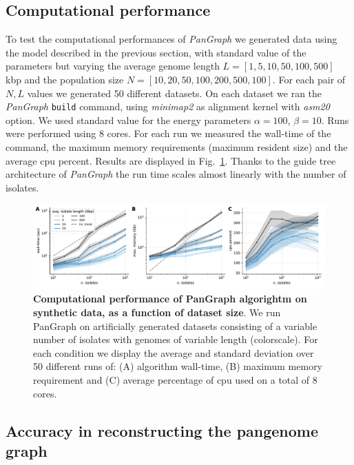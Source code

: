 \documentclass[aps,rmp,reprint,superscriptaddress,notitlepage,10pt,onecolumn]{revtex4-1}
\begin{document}
\subsection{Computational performance}

To test the computational performances of \textit{PanGraph} we generated data using the model described in the previous section, with standard value of the parameters but varying the average genome length $L=[1,5,10,50,100,500]$ kbp and the population size $N=[10,20,50,100,200,500,100]$. For each pair of $N,L$ values we generated 50 different datasets. On each dataset we ran the \textit{PanGraph} \verb|build| command, using \textit{minimap2} as alignment kernel with \textit{asm20} option. We used standard value for the energy parameters $\alpha=100$, $\beta=10$. Runs were performed using 8 cores. For each run we measured the wall-time of the command, the maximum memory requirements (maximum resident size) and the average cpu percent. Results are displayed in Fig.~\ref{fig:benchmark-perf-suppl}.
Thanks to the guide tree architecture of \textit{PanGraph} the run time scales almost linearly with the number of isolates.

\begin{figure}[htb]
    \includegraphics[width=.9\textwidth]{figs_suppl/benchmark_suppl.pdf}
    \caption{{\bf Computational performance of PanGraph algorightm on synthetic data, as a function of dataset size}. We run PanGraph on artificially generated datasets consisting of a variable number of isolates with genomes of variable length (colorscale). For each condition we display the average and standard deviation over 50 different runs of: (A) algorithm wall-time, (B) maximum memory requirement and (C) average percentage of cpu used on a total of 8 cores.}
    \label{fig:benchmark-perf-suppl}
\end{figure}


\subsection{Accuracy in reconstructing the pangenome graph}
\end{document}
